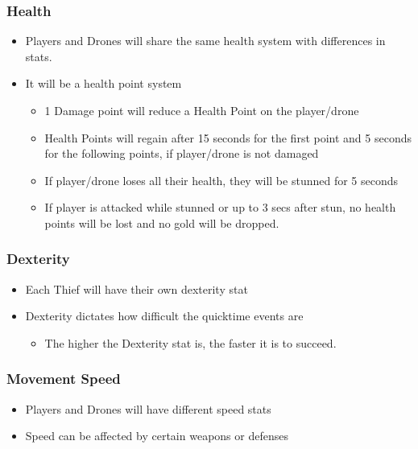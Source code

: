 \documentclass[10pt]{report}
\begin{document}
\subsubsection{Health}

\begin{itemize}
    \item Players and Drones will share the same health system with differences in stats.
    \item It will be a health point system
    \begin{itemize}
        \item 1 Damage point will reduce a Health Point on the player/drone
        \item Health Points will regain after 15 seconds for the first point and 5 seconds for the following points, if player/drone is not damaged
        \item If player/drone loses all their health, they will be stunned for 5 seconds
        \item If player is attacked while stunned or up to 3 secs after stun, no health points will be lost and no gold will be dropped.    
    \end{itemize}
\end{itemize}

\subsubsection{Dexterity}

\begin{itemize}
    \item Each Thief will have their own dexterity stat
    \item Dexterity dictates how difficult the quicktime events are
    \begin{itemize}
        \item The higher the Dexterity stat is, the faster it is to succeed.    
    \end{itemize}
\end{itemize}

\subsubsection{Movement Speed}

\begin{itemize}
    \item Players and Drones will have different speed stats
    \item Speed can be affected by certain weapons or defenses
\end{itemize}
\end{document}

